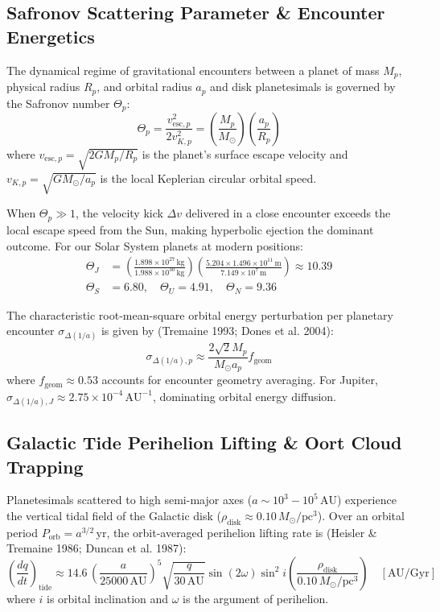 \documentclass[11pt,a4paper]{article}
\begin{document}
\subsection{Safronov Scattering Parameter \& Encounter Energetics}
The dynamical regime of gravitational encounters between a planet of mass $M_p$, physical radius $R_p$, and orbital radius $a_p$ and disk planetesimals is governed by the Safronov number $\Theta_p$:
\begin{equation}
\Theta_p = \frac{v_{\text{esc}, p}^2}{2 v_{K, p}^2} = \left(\frac{M_p}{M_\odot}\right) \left(\frac{a_p}{R_p}\right)
\label{eq:safronov}
\end{equation}
where $v_{\text{esc}, p} = \sqrt{2 G M_p / R_p}$ is the planet's surface escape velocity and $v_{K, p} = \sqrt{G M_\odot / a_p}$ is the local Keplerian circular orbital speed.

When $\Theta_p \gg 1$, the velocity kick $\Delta v$ delivered in a close encounter exceeds the local escape speed from the Sun, making hyperbolic ejection the dominant outcome. For our Solar System planets at modern positions:
\begin{align}
\Theta_J &= \left(\frac{1.898 \times 10^{27}\,\text{kg}}{1.988 \times 10^{30}\,\text{kg}}\right) \left(\frac{5.204 \times 1.496 \times 10^{11}\,\text{m}}{7.149 \times 10^7\,\text{m}}\right) \approx 10.39 \\
\Theta_S &= 6.80, \quad \Theta_U = 4.91, \quad \Theta_N = 9.36
\end{align}

The characteristic root-mean-square orbital energy perturbation per planetary encounter $\sigma_{\Delta(1/a)}$ is given by (Tremaine 1993; Dones et al. 2004):
\begin{equation}
\sigma_{\Delta(1/a), p} \approx \frac{2\sqrt{2} M_p}{M_\odot a_p} f_{\text{geom}}
\label{eq:rms_kick}
\end{equation}
where $f_{\text{geom}} \approx 0.53$ accounts for encounter geometry averaging. For Jupiter, $\sigma_{\Delta(1/a), J} \approx 2.75 \times 10^{-4}\,\text{AU}^{-1}$, dominating orbital energy diffusion.

\subsection{Galactic Tide Perihelion Lifting \& Oort Cloud Trapping}
Planetesimals scattered to high semi-major axes ($a \sim 10^3 - 10^5\,\text{AU}$) experience the vertical tidal field of the Galactic disk ($\rho_{\text{disk}} \approx 0.10\,M_\odot/\text{pc}^3$). Over an orbital period $P_{\text{orb}} = a^{3/2}\,\text{yr}$, the orbit-averaged perihelion lifting rate is (Heisler \& Tremaine 1986; Duncan et al. 1987):
\begin{equation}
\left(\frac{dq}{dt}\right)_{\text{tide}} \approx 14.6\,\left(\frac{a}{25000\,\text{AU}}\right)^5 \sqrt{\frac{q}{30\,\text{AU}}} \sin(2\omega) \sin^2 i \left(\frac{\rho_{\text{disk}}}{0.10\,M_\odot/\text{pc}^3}\right)\quad [\text{AU/Gyr}]
\label{eq:galactic_tide}
\end{equation}
where $i$ is orbital inclination and $\omega$ is the argument of perihelion.
\end{document}
